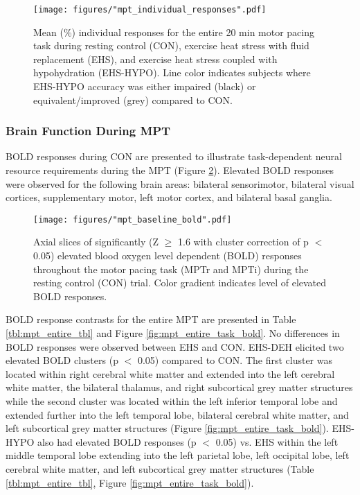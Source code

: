 \begin{figure}
	\centering
	\texttt{[image: figures/"mpt\_individual\_responses".pdf]}
	\caption{Mean (\%) individual responses for the entire 20 min motor pacing task during resting control (CON), exercise heat stress with fluid replacement (EHS), and exercise heat stress coupled with hypohydration (EHS-HYPO). Line color indicates subjects where EHS-HYPO accuracy was either impaired (black) or equivalent/improved (grey) compared to CON.}
	\label{fig:mpt_individual}	
\end{figure}

\subsubsection{Brain Function During MPT}
BOLD responses during CON are presented to illustrate task-dependent neural resource requirements during the MPT (Figure \ref{fig:mpt_baseline_bold}). Elevated BOLD responses were observed for the following brain areas: bilateral sensorimotor, bilateral visual cortices, supplementary motor, left motor cortex, and bilateral basal ganglia. 

\begin{figure}
	\centering
	\texttt{[image: figures/"mpt\_baseline\_bold".pdf]}
	\caption{Axial slices of significantly (Z ${\ge}$ 1.6 with cluster correction of p ${<}$ 0.05) elevated blood oxygen level dependent (BOLD) responses throughout the motor pacing task (MPTr and MPTi) during the resting control (CON) trial. Color gradient indicates level of elevated BOLD responses.}
	\label{fig:mpt_baseline_bold}	
\end{figure}

BOLD response contrasts for the entire MPT are presented in Table \ref{tbl:mpt_entire_tbl} and Figure \ref{fig:mpt_entire_task_bold}. No differences in BOLD responses were observed between EHS and CON. EHS-DEH elicited two elevated BOLD clusters (p ${<}$ 0.05) compared to CON. The first cluster was located within right cerebral white matter and extended into the left cerebral white matter, the bilateral thalamus, and right subcortical grey matter structures while the second cluster was located within the left inferior temporal lobe and extended further into the left temporal lobe, bilateral cerebral white matter, and left subcortical grey matter structures (Figure \ref{fig:mpt_entire_task_bold}). EHS-HYPO also had elevated BOLD responses (p ${<}$ 0.05) vs. EHS within the left middle temporal lobe extending into the left parietal lobe, left occipital lobe, left cerebral white matter, and left subcortical grey matter structures (Table \ref{tbl:mpt_entire_tbl}, Figure \ref{fig:mpt_entire_task_bold}).


